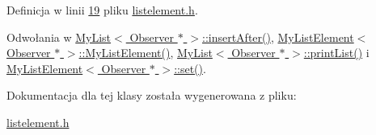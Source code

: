 Definicja w linii \hyperlink{listelement_8h_source_l00019}{19} pliku \hyperlink{listelement_8h_source}{listelement.\-h}.



Odwołania w \hyperlink{mylist_8h_source_l00212}{My\-List$<$ Observer $\ast$ $>$\-::insert\-After()}, \hyperlink{mylistelement_8h_source_l00037}{My\-List\-Element$<$ Observer $\ast$ $>$\-::\-My\-List\-Element()}, \hyperlink{mylist_8h_source_l00156}{My\-List$<$ Observer $\ast$ $>$\-::print\-List()} i \hyperlink{mylistelement_8h_source_l00060}{My\-List\-Element$<$ Observer $\ast$ $>$\-::set()}.



Dokumentacja dla tej klasy została wygenerowana z pliku\-:\begin{DoxyCompactItemize}
\item 
\hyperlink{listelement_8h}{listelement.\-h}\end{DoxyCompactItemize}
